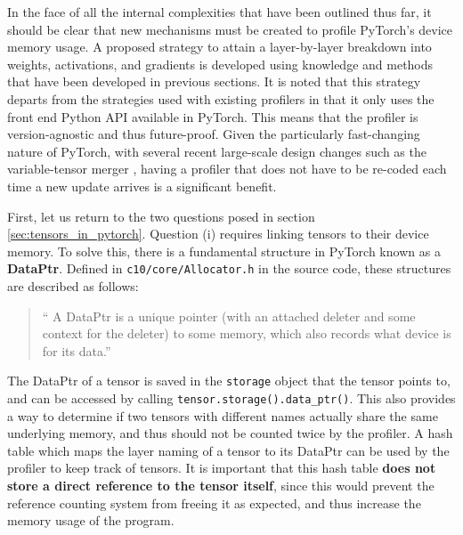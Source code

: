 \documentclass[12pt,letterpaper]{article}
\begin{document}
In the face of all the internal complexities that have been outlined thus far, it should be clear that new mechanisms must be created to profile PyTorch's device memory usage. A proposed strategy to attain a layer-by-layer breakdown into weights, activations, and gradients is developed using knowledge and methods that have been developed in previous sections. It is noted that this strategy departs from the strategies used with existing profilers in that it only uses the front end Python API available in PyTorch. This means that the profiler is version-agnostic and thus future-proof. Given the particularly fast-changing nature of PyTorch, with several recent large-scale design changes such as the variable-tensor merger \cite{pytorch_variable_tensor_merger}, having a profiler that does not have to be re-coded each time a new update arrives is a significant benefit. 
\par 

First, let us return to the two questions posed in section \ref{sec:tensors_in_pytorch}. Question (i) requires linking tensors to their device memory. To solve this, there is a fundamental structure in PyTorch known as a \textbf{DataPtr}. Defined in \texttt{c10/core/Allocator.h} in the source code, these structures are described as follows:
\begin{quote}
\enquote{
A DataPtr is a unique pointer (with an attached deleter and some context for the deleter) to some memory, which also records what device is for its data.}
\end{quote}
The DataPtr of a tensor is saved in the \texttt{storage} object that the tensor points to, and can be accessed by calling \texttt{tensor.storage().data\_ptr()}. This also provides a way to determine if two tensors with different names actually share the same underlying memory, and thus should not be counted twice by the profiler. A hash table which maps the layer naming of a tensor to its DataPtr can be used by the profiler to keep track of tensors. It is important that this hash table \textbf{does not store a direct reference to the tensor itself}, since this would prevent the reference counting system from freeing it as expected, and thus increase the memory usage of the program. 
\par 
\end{document}
